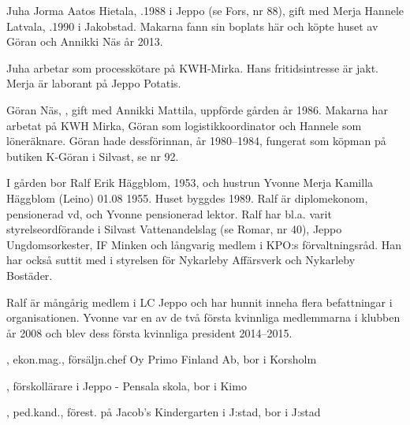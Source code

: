 %

%
Juha Jorma Aatos Hietala, .1988 i Jeppo (se Fors, nr 88), gift med Merja Hannele Latvala, .1990 i Jakobstad. Makarna fann sin boplats här och köpte huset av Göran och Annikki Näs år 2013.

Juha arbetar som processkötare på KWH-Mirka. Hans fritidsintresse är jakt. Merja är laborant på Jeppo Potatis.
\begin{jhchildren}
  \item {}
  \item {}
\end{jhchildren}


Göran Näs, , gift med Annikki Mattila,  uppförde gården år 1986. Makarna har arbetat på KWH Mirka, Göran som logistikkoordinator och Hannele som löneräknare. Göran hade dessförinnan, år 1980--1984, fungerat som köpman på butiken K-Göran i Silvast, se nr 92.



%

%
I gården bor Ralf Erik Häggblom,  1953, och hustrun Yvonne Merja Kamilla Häggblom (Leino) 01.08 1955. Huset byggdes 1989. Ralf är diplomekonom, pensionerad vd, och Yvonne pensionerad lektor. Ralf har bl.a. varit styrelseordförande i Silvast Vattenandelslag (se Romar, nr 40), Jeppo Ungdomsorkester, IF Minken och långvarig medlem i KPO:s förvaltningsråd. Han har också suttit med i styrelsen för Nykarleby Affärsverk och Nykarleby Bostäder.

Ralf är mångårig medlem i LC Jeppo och har hunnit inneha flera befattningar i organisationen. Yvonne var en av de två första kvinnliga medlemmarna i klubben år 2008 och blev dess första kvinnliga president 2014--2015.

\begin{jhchildren}
  \item {}, ekon.mag., försäljn.chef Oy Primo Finland Ab, bor i Korsholm
  \item {}, förskollärare i Jeppo - Pensala skola, bor i Kimo
  \item {}, ped.kand., förest. på Jacob’s Kindergarten i J:stad, bor i J:stad
\end{jhchildren}



